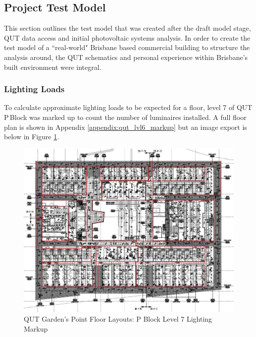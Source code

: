 
\subsection{Project Test Model} \label{section:project-model}

This section outlines the test model that was created after the draft model stage, QUT data access and initial photovoltaic systems analysis. In order to create the test model of a ``real-world" Brisbane based commercial building to structure the analysis around, the QUT schematics and personal experience within Brisbane's built environment were integral. 

\subsubsection{Lighting Loads}

To calculate approximate lighting loads to be expected for a floor, level 7 of QUT P\,Block was marked up to count the number of luminaires installed. A full floor plan is shown in Appendix \ref{appendix:qut_lvl6_markup} but an image export is below in Figure \ref{fig:qut-lvl6-lighting-markup}.      

\begin{figure}[H]
	\hfill\includegraphics[width = 150mm]{images/project-model/qut-lvl7-lighting-markup}\hspace*{\fill}
	\caption{QUT Garden's Point Floor Layouts: P Block Level 7 Lighting Markup} 
	\label{fig:qut-lvl6-lighting-markup}
\end{figure}

